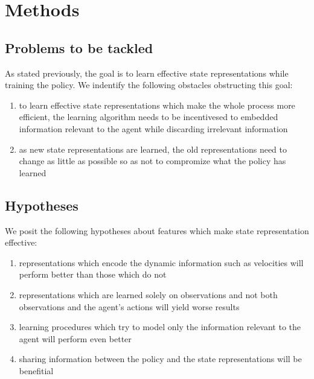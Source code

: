 \chapter{Methods}
\section{Problems to be tackled}
As stated previously, the goal is to learn effective state representations
while training the policy.
We indentify the following obstacles obstructing this goal:
\begin{enumerate}
		\item to learn effective state representations which make the whole
		process more efficient, the learning algorithm needs to be incentivesed
		to embedded information relevant to the agent
		while discarding irrelevant information
\item as new state representations are learned, the old representations need
		to change as little as possible so as not to compromize what
		the policy has learned
\end{enumerate}


\section{Hypotheses}
We posit the following hypotheses about features which make state representation 
effective:
\begin{enumerate}
		\item representations which encode the dynamic information
such as velocities will perform better than those which do not
\item representations which are learned solely on observations 
		and not both observations and the agent's actions
		will yield worse results
\item learning procedures which try to model only the information
		relevant to the agent will perform even better
\item sharing information between the policy and the state representations
		will be benefitial
\end{enumerate}

